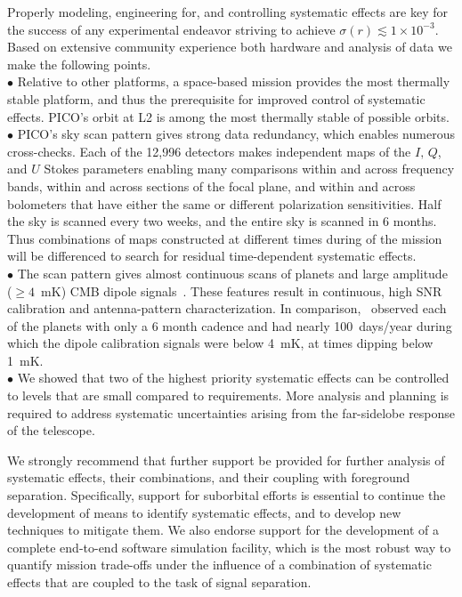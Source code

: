 \documentclass[PICOReport.tex]{subfiles}
\begin{document}
Properly modeling, engineering for, and controlling systematic effects are key for the success of any experimental endeavor striving to achieve $\sigma(r) \lesssim 1 \times 10^{-3}$. Based on extensive community experience both hardware and analysis of data we make the following points. \\
$\bullet$ \hspace{0.1in}  Relative to other platforms, a space-based mission provides the most thermally stable platform, and thus the prerequisite for improved control of systematic effects. PICO's orbit at L2 is among the most thermally stable of possible orbits. \\
$\bullet$ \hspace{0.1in} PICO's sky scan pattern gives strong data redundancy, which enables numerous cross-checks. Each of the 12,996 detectors makes independent maps of the $I,\,Q$, and $U$ Stokes parameters enabling many comparisons within and across frequency bands, within and across sections of the focal plane, and within and across bolometers that have either the same or different polarization sensitivities. Half the sky is scanned every two weeks, and the entire sky is scanned in 6 months. Thus combinations of maps constructed at different times during of the mission will be differenced to search for residual time-dependent systematic effects. \\
$\bullet$ \hspace{0.1in}  The scan pattern gives almost continuous scans of planets and large amplitude ($\geq 4$~mK) CMB dipole signals~\citep{picoweb_dipole}. These features result in continuous, high \ac{SNR} calibration and antenna-pattern characterization. In comparison, \planck\ observed each of the planets with only a 6 month cadence and had nearly 100~days/year during which the dipole calibration signals were below 4~mK, at times dipping below 1~mK. \\
$\bullet$ \hspace{0.1in}  We showed that two of the highest priority systematic effects can be controlled to levels that are small compared to requirements. More analysis and planning is required to address systematic uncertainties arising from the far-sidelobe response of the telescope. 

We strongly recommend that further support be provided for further analysis of systematic effects, their combinations, and their coupling with foreground separation. Specifically, support for suborbital efforts is essential to continue the development of means to identify systematic effects, and to develop new techniques to mitigate them. We also endorse support for the development of a complete end-to-end software simulation facility, which is the most robust way to quantify mission trade-offs under the influence of a combination of systematic effects that are coupled to the task of signal separation.  
\end{document}
